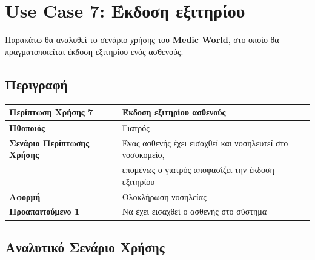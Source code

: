 \documentclass{article}
\newcommand\T{\rule{0pt}{2.6ex}}       %
\newcommand\B{\rule[-1.2ex]{0pt}{0pt}}
\begin{document}
\section{Use Case 7: Έκδοση εξιτηρίου}

Παρακάτω θα αναλυθεί το σενάριο χρήσης του \textbf{Medic World}, στο οποίο θα πραγματοποιείται έκδοση εξιτηρίου ενός ασθενούς.

\subsection{Περιγραφή}

\begin{center}
     \begin{tabular}{|l|l|}
     \hline
      \textbf{Περίπτωση Χρήσης 7} & Έκδοση εξιτηρίου ασθενούς \T\B \\
      \hline
      \textbf{Ηθοποιός} & Γιατρός \T\B \\
      \hline
      \textbf{Σενάριο Περίπτωσης Χρήσης} & Ένας ασθενής έχει εισαχθεί και νοσηλευτεί στο νοσοκομείο, \T \\& επομένως ο γιατρός αποφασίζει την έκδοση εξιτηρίου  \B \\
      \hline
      \textbf{Αφορμή} & Ολοκλήρωση νοσηλείας \T\B \\
      \hline
      \textbf{Προαπαιτούμενο 1} & Να έχει εισαχθεί ο ασθενής στο σύστημα \T\B \\
      \hline
     \end{tabular}
 \end{center}
 
\newpage
 
\subsection{Αναλυτικό Σενάριο Χρήσης}
\end{document}
